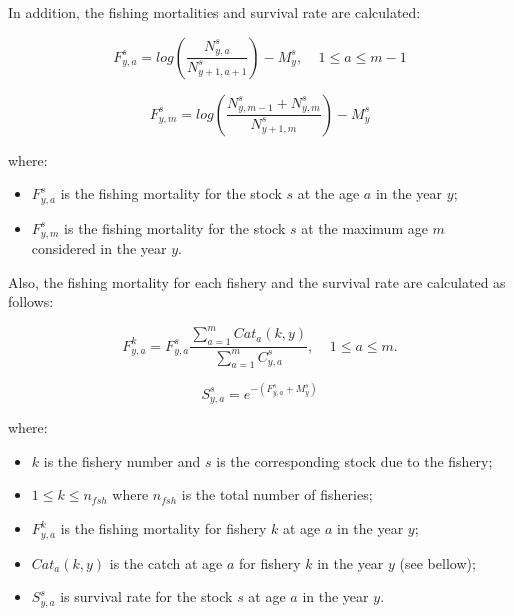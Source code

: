 \documentclass{article}
\begin{document}
\hfill

In addition, the fishing mortalities and survival rate are calculated:

\begin{equation}
F^s_{y,a}=log\left(\dfrac{N^s_{y,a}}{N^s_{y+1,a+1}}\right)-M^s_y, \ \ \ \ \ 1\leq a \leq m-1
\end{equation}

\begin{equation}
F^s_{y,m}=log\left(\dfrac{N^s_{y,m-1}+N^s_{y,m}}{N^s_{y+1,m}}\right)-M^s_y
\end{equation}

where:

\begin{itemize}
    \item $F^s_{y,a}$ is the fishing mortality for the stock $s$ at the age $a$ in the year $y$;

    \item $F^s_{y,m}$ is the fishing mortality for the stock $s$ at the maximum age $m$ considered in the year $y$.
\end{itemize}

\hfill

Also, the fishing mortality for each fishery and the survival rate are calculated as follows:

\begin{equation}
F^k_{y,a}=F^s_{y,a} \dfrac{\sum_{a = 1} ^{m} Cat_a(k,y)}{\sum_{a=1} ^{m} C^s_{y,a}}, \ \ \ \ \ 1\leq a \leq m.
\end{equation}

\begin{equation}
S^s_{y,a}=e^{-(F^s_{y,a}+M^s_{y})}
\end{equation}

where:
\begin{itemize}
    \item $k$ is the fishery number and $s$ is the corresponding stock due to the fishery;
    
    \item $1\leq k \leq n_{fsh}$ where $n_{fsh}$ is the total number of fisheries;
   
    \item $F^k_{y,a}$ is the fishing mortality for fishery $k$ at age $a$ in the year $y$;

    \item $Cat_a(k,y)$ is the catch at age $a$ for fishery $k$ in the year $y$ (see bellow);
    
    \item $S^s_{y,a}$ is survival rate for the stock $s$ at age $a$ in the year $y$.
\end{itemize}
\end{document}

